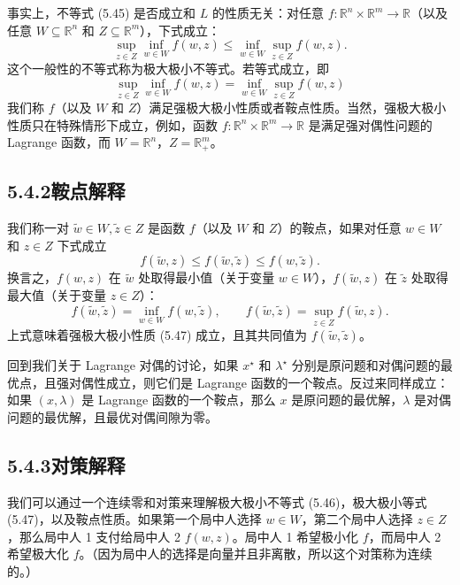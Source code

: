 \documentclass[UTF8,12pt,a4paper,fontset=fandol]{ctexart}
\begin{document}
事实上，不等式 (5.45) 是否成立和 $L$ 的性质无关：对任意 $f:\mathbb{R}^n\times\mathbb{R}^m\to\mathbb{R}$（以及任意 $W\subseteq\mathbb{R}^n$ 和 $Z\subseteq\mathbb{R}^m$），下式成立：
\begin{equation}
\sup_{z\in Z}\inf_{w\in W} f(w,z)\leq \inf_{w\in W}\sup_{z\in Z} f(w,z).
\tag{5.46}
\end{equation}
这个一般性的不等式称为极大极小不等式。若等式成立，即
\begin{equation}
\sup_{z\in Z}\inf_{w\in W} f(w,z)=\inf_{w\in W}\sup_{z\in Z} f(w,z)
\tag{5.47}
\end{equation}
我们称 $f$（以及 $W$ 和 $Z$）满足强极大极小性质或者鞍点性质。当然，强极大极小性质只在特殊情形下成立，例如，函数 $f:\mathbb{R}^n\times\mathbb{R}^m\to\mathbb{R}$ 是满足强对偶性问题的 Lagrange 函数，而 $W=\mathbb{R}^n$，$Z=\mathbb{R}_+^m$。

\subsection*{5.4.2\quad 鞍点解释}

我们称一对 $\tilde{w}\in W,\tilde{z}\in Z$ 是函数 $f$（以及 $W$ 和 $Z$）的鞍点，如果对任意 $w\in W$ 和 $z\in Z$ 下式成立
\[
f(\tilde{w},z)\leq f(\tilde{w},\tilde{z})\leq f(w,\tilde{z}).
\]
换言之，$f(w,z)$ 在 $\tilde{w}$ 处取得最小值（关于变量 $w\in W$），$f(\tilde{w},z)$ 在 $\tilde{z}$ 处取得最大值（关于变量 $z\in Z$）：
\[
f(\tilde{w},\tilde{z})=\inf_{w\in W} f(w,\tilde{z}),\qquad
f(\tilde{w},\tilde{z})=\sup_{z\in Z} f(\tilde{w},z).
\]
上式意味着强极大极小性质 (5.47) 成立，且其共同值为 $f(\tilde{w},\tilde{z})$。

回到我们关于 Lagrange 对偶的讨论，如果 $x^\star$ 和 $\lambda^\star$ 分别是原问题和对偶问题的最优点，且强对偶性成立，则它们是 Lagrange 函数的一个鞍点。反过来同样成立：如果 $(x,\lambda)$ 是 Lagrange 函数的一个鞍点，那么 $x$ 是原问题的最优解，$\lambda$ 是对偶问题的最优解，且最优对偶间隙为零。

\subsection*{5.4.3\quad 对策解释}

我们可以通过一个连续零和对策来理解极大极小不等式 (5.46)，极大极小等式 (5.47)，以及鞍点性质。如果第一个局中人选择 $w\in W$，第二个局中人选择 $z\in Z$，那么局中人 1 支付给局中人 2 $f(w,z)$。局中人 1 希望极小化 $f$，而局中人 2 希望极大化 $f$。（因为局中人的选择是向量并且非离散，所以这个对策称为连续的。）
\end{document}
